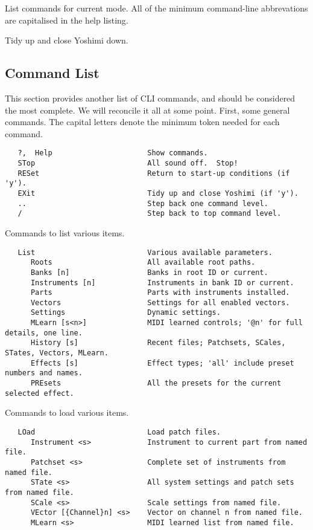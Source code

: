       List commands for current mode.  All of the minimum command-line
      abbrevations are capitalised in the help listing.

         Tidy up and close Yoshimi down.

\subsection{Command List}
\label{subsec:command_line_command_list}

   This section provides another list of CLI commands, and should be considered
   the most complete.  We will reconcile it all at some point.
   First, some general commands.  The capital letters denote the minimum token
   needed for each command.

\begin{verbatim}
   ?,  Help                      Show commands.
   STop                          All sound off.  Stop!
   RESet                         Return to start-up conditions (if 'y').
   EXit                          Tidy up and close Yoshimi (if 'y').
   ..                            Step back one command level.
   /                             Step back to top command level.
\end{verbatim}

   Commands to list various items.

\begin{verbatim}
   List                          Various available parameters.
      Roots                      All available root paths.
      Banks [n]                  Banks in root ID or current.
      Instruments [n]            Instruments in bank ID or current.
      Parts                      Parts with instruments installed.
      Vectors                    Settings for all enabled vectors.
      Settings                   Dynamic settings.
      MLearn [s<n>]              MIDI learned controls; '@n' for full details, one line.
      History [s]                Recent files; Patchsets, SCales, STates, Vectors, MLearn.
      Effects [s]                Effect types; 'all' include preset numbers and names.
      PREsets                    All the presets for the current selected effect.
\end{verbatim}

   Commands to load various items.

\begin{verbatim}
   LOad                          Load patch files.
      Instrument <s>             Instrument to current part from named file.
      Patchset <s>               Complete set of instruments from named file.
      STate <s>                  All system settings and patch sets from named file.
      SCale <s>                  Scale settings from named file.
      VEctor [{Channel}n] <s>    Vector on channel n from named file.
      MLearn <s>                 MIDI learned list from named file.
\end{verbatim}

